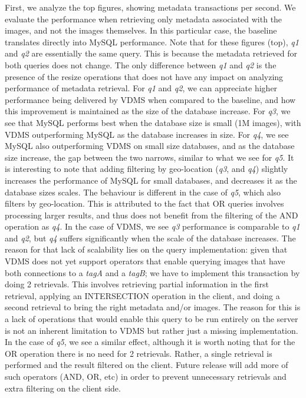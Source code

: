 First, we analyze the top figures, showing metadata transactions per second.
We evaluate the performance when retrieving only metadata associated with the images,
and not the images themselves.
In this particular case, the baseline translates directly into MySQL performance.
Note that for these figures (top), \textit{q1} and \textit{q2} are
essentially the same query. This is because the metadata retrieved for both
queries does not change. The only difference between \textit{q1} and \textit{q2}
is the presence of the resize operations that does not have any impact on
analyzing performance of metadata retrieval.
For \textit{q1} and \textit{q2}, we can appreciate higher performance being delivered by
VDMS when compared to the baseline, and how this improvement is maintained
as the size of the database increase.
For \textit{q3}, we see that MySQL performs best when the database size
is small (1M images), with VDMS outperforming MySQL as the database increases in size.
For \textit{q4}, we see MySQL also outperforming VDMS on small size databases, and as
the database size increase, the gap between the two narrows,
similar to what we see for \textit{q5}.
It is interesting to note that adding filtering by geo-location
(\textit{q3}, and \textit{q4}) slightly increases the performance of MySQL
for small databases, and decreases it as the database sizes scales.
The behaviour is different in the case of \textit{q5},
which also filters by geo-location.
This is attributed to the fact that OR queries involves processing larger results,
and thus does not benefit from the filtering of the AND operation as \textit{q4}.
In the case of VDMS, we see \textit{q3} performance is comparable to \textit{q1}
and \textit{q2}, but \textit{q4} suffers significantly
when the scale of the database increases.
The reason for that lack of scalability lies on the query implementation: given that
VDMS does not yet support operators that enable querying images
that have both connections to a \textit{tagA} and a \textit{tagB};
we have to implement this transaction by doing 2 retrievals.
This involves retrieving partial information in the first retrieval,
applying an INTERSECTION operation in the client, and doing a second retrieval
to bring the right metadata and/or images.
The reason for this is a lack of operations that would enable this query to be
run entirely on the server is not an inherent limitation to VDMS but rather
just a missing implementation.
In the case of \textit{q5}, we see a similar effect, although it is worth noting
that for the OR operation there is no need for 2 retrievals.
Rather, a single retrieval is performed and the result filtered on the client.
Future release will add more of such operators (AND, OR, etc) in order to prevent
unnecessary retrievals and extra filtering on the client side.

